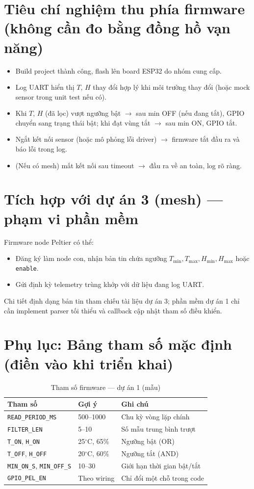 \documentclass[12pt,a4paper]{report}
\begin{document}
\section{Tiêu chí nghiệm thu phía firmware (không cần đo bằng đồng hồ vạn năng)}
\begin{itemize}
  \item Build project thành công, flash lên board ESP32 do nhóm cung cấp.
  \item Log UART hiển thị $T$, $H$ thay đổi hợp lý khi môi trường thay đổi (hoặc mock sensor trong unit test nếu có).
  \item Khi $T$, $H$ (đã lọc) vượt ngưỡng bật $\rightarrow$ sau min OFF (nếu đang tắt), GPIO chuyển sang trạng thái bật; khi đạt vùng tắt $\rightarrow$ sau min ON, GPIO tắt.
  \item Ngắt kết nối sensor (hoặc mô phỏng lỗi driver) $\rightarrow$ firmware tắt đầu ra và báo lỗi trong log.
  \item (Nếu có mesh) mất kết nối sau timeout $\rightarrow$ đầu ra về an toàn, log rõ ràng.
\end{itemize}

\section{Tích hợp với dự án 3 (mesh) --- phạm vi phần mềm}
Firmware node Peltier có thể:
\begin{itemize}
  \item Đăng ký làm node con, nhận bản tin chứa ngưỡng $T_{\min}, T_{\max}, H_{\min}, H_{\max}$ hoặc \texttt{enable}.
  \item Gửi định kỳ telemetry trùng khớp với dữ liệu đang log UART.
\end{itemize}
Chi tiết định dạng bản tin tham chiếu tài liệu dự án 3; phần mềm dự án 1 chỉ cần implement parser tối thiểu và callback cập nhật tham số điều khiển.

\section{Phụ lục: Bảng tham số mặc định (điền vào khi triển khai)}
\begin{table}[H]
\centering
\caption{Tham số firmware --- dự án 1 (mẫu)}
\begin{tabular}{|l|l|p{6.5cm}|}
\hline
\textbf{Tham số} & \textbf{Gợi ý} & \textbf{Ghi chú} \\
\hline
\texttt{READ\_PERIOD\_MS} & 500--1000 & Chu kỳ vòng lặp chính \\
\hline
\texttt{FILTER\_LEN} & 5--10 & Số mẫu trung bình trượt \\
\hline
\texttt{T\_ON}, \texttt{H\_ON} & 25$^\circ$C, 65\% & Ngưỡng bật (OR) \\
\hline
\texttt{T\_OFF}, \texttt{H\_OFF} & 20$^\circ$C, 60\% & Ngưỡng tắt (AND) \\
\hline
\texttt{MIN\_ON\_S}, \texttt{MIN\_OFF\_S} & 10--30 & Giới hạn thời gian bật/tắt \\
\hline
\texttt{GPIO\_PEL\_EN} & Theo wiring & Chỉ đổi một chỗ trong code \\
\hline
\end{tabular}
\end{table}
\end{document}
